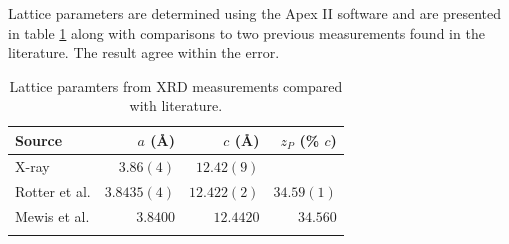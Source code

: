Lattice parameters are determined using the Apex II software and are presented in table \ref{Table:ResD:LatticeParams} along with comparisons to two previous measurements found in the literature. The result agree within the error.
\medskip
\begin{table}[htbp]
    \begin{center}
        \caption{Lattice paramters from XRD measurements compared with literature.}
        \begin{tabular}{lrrr}
\toprule
Source  &  $a$ (\AA) & $c$ (\AA) & $z_P$ (\% $c$)\\
\midrule
X-ray   & $3.86(4)$  & $12.42(9)$ & \\
Rotter et al.\cite{Rotter2010} & $3.8435(4) $ & $12.422(2)$ & $34.59(1)$ \\
Mewis et al.\cite{Mewis1980} & $3.8400$ & $12.4420$ & $34.560$ \\
\bottomrule
        \label{Table:ResD:LatticeParams}
        \end{tabular}
    \end{center}
\end{table}

